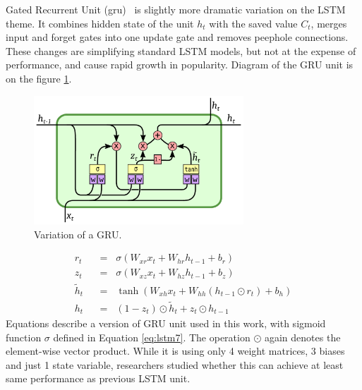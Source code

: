 Gated Recurrent Unit (\gls{gru})~\cite{DBLP:journals/corr/ChoMGBSB14} is slightly more dramatic variation on the LSTM theme. It combines hidden state of the unit $ h_t $ with the saved value $ C_t $, merges input and forget gates into one update gate and removes peephole connections. These changes are simplifying standard LSTM models, but not at the expense of performance, and cause rapid growth in popularity. Diagram of the GRU unit is on the figure \ref{fig:gru}.
\begin{figure}[!t]
	\centering
	\includegraphics[width=0.7\textwidth]{./fig/gru.pdf}
	\caption{Variation of a GRU.
		\label{fig:gru}}
\end{figure}
\begin{align}
r_t \hspace{7pt}&=\hspace{7pt} \sigma(W_{xr}x_t + W_{hr}h_{t-1} + b_r) \label{eq:gru1}\\
z_t \hspace{7pt}&=\hspace{7pt} \sigma(W_{xz}x_t + W_{hz}h_{t-1} + b_z) \label{eq:gru2}\\
\widetilde{h}_t \hspace{7pt}&=\hspace{7pt} \tanh(W_{xh}x_t + W_{hh}(h_{t-1}\odot r_t) + b_h) \label{eq:gru3}\\
h_t \hspace{7pt}&=\hspace{7pt} (1-z_t)\odot \widetilde{h}_t + z_t\odot h_{t-1} \label{eq:gru4}
\end{align}
Equations describe a version of GRU unit used in this work, with sigmoid function $ \sigma $ defined in Equation \eqref{eq:lstm7}. The operation $ \odot $ again denotes the element-wise vector product. While it is using only 4 weight matrices, 3 biases and just 1 state variable, researchers studied whether this can achieve at least same performance as previous LSTM unit.

